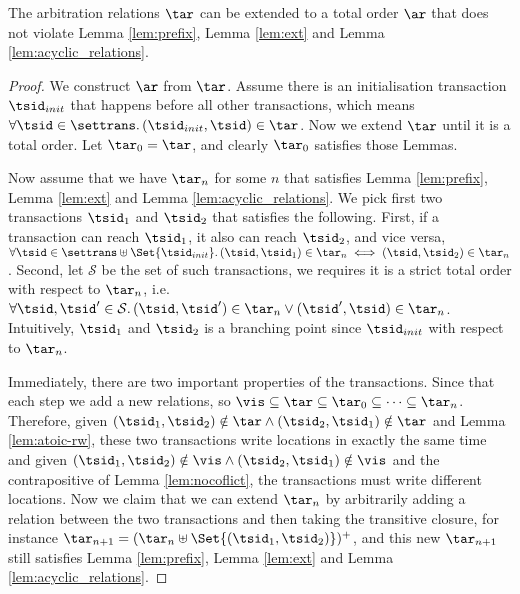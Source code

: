 \begin{lem}[totalorder]
    The arbitration relations \( \tar \) can be extended to a total order \( \ar \) that does not violate Lemma \ref{lem:prefix}, Lemma \ref{lem:ext} and Lemma \ref{lem:acyclic_relations}.
\end{lem}
\begin{proof}
    We construct \( \ar \) from \( \tar \).
    Assume there is an initialisation transaction \( \tsid_{init} \) that happens before all other transactions, which means \( \forall \tsid \in \settrans \ldotp (\tsid_{init} , \tsid ) \in \tar\).
    Now we extend \( \tar \) until it is a total order.
    Let \( \tar_{0} = \tar \), and clearly \( \tar_{0} \) satisfies those Lemmas.

    Now assume that we have \( \tar_{n} \) for some \( n \) that satisfies Lemma \ref{lem:prefix}, Lemma \ref{lem:ext} and Lemma \ref{lem:acyclic_relations}.
    We pick first two transactions \( \tsid_{1} \) and \( \tsid_{2} \) that satisfies the following.
    First, if a transaction can reach \( \tsid_{1} \), it also can reach \( \tsid_{2} \), and vice versa, \( \forall \tsid \in \settrans \uplus \Set{\tsid_{init}} \ldotp (\tsid, \tsid_{1}) \in \tar_{n} \iff (\tsid, \tsid_{2}) \in \tar_{n} \).
    Second, let \( \mathcal{S} \) be the set of such transactions, we requires it is a strict total order with respect to \( \tar_{n} \), i.e.\ \( \forall \tsid, \tsid' \in \mathcal{S} \ldotp (\tsid,\tsid') \in \tar_{n} \lor (\tsid',\tsid) \in \tar_{n}  \).
    Intuitively, \( \tsid_{1} \) and \( \tsid_{2} \) is a branching point since \( \tsid_{init} \) with respect to \( \tar_{n} \).

    Immediately, there are two important properties of the transactions.
    Since that each step we add a new relations, so \( \vis \subseteq \tar \subseteq \tar_{0} \subseteq \dots \subseteq \tar_{n} \).
    Therefore, given \( ( \tsid_{1}, \tsid_{2} ) \notin \tar \land ( \tsid_{2}, \tsid_{1} ) \notin \tar \) and Lemma \ref{lem:atoic-rw}, these two transactions write locations in exactly the same time and given \( ( \tsid_{1}, \tsid_{2} ) \notin \vis \land ( \tsid_{2}, \tsid_{1} ) \notin \vis \) and the contrapositive of Lemma \ref{lem:nocoflict}, the transactions must write different locations.
    Now we claim that we can extend \( \tar_{n} \) by arbitrarily adding a relation between the two transactions and then taking the transitive closure, for instance \( \tar_{n+1} = ( \tar_{n} \uplus \Set{(\tsid_{1}, \tsid_{2})} )^{+}  \), and this new \( \tar_{n+1} \) still satisfies Lemma \ref{lem:prefix}, Lemma \ref{lem:ext} and Lemma \ref{lem:acyclic_relations}.


\end{proof}
